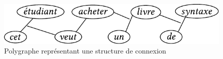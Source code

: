 {\begin{figure}[H]
\includegraphics[scale=.75]{figures/ceetudiantveutacheterunlivredesyntaxe.pdf}
\caption{\label{fig:}Polygraphe représentant une structure de connexion}
\end{figure}
}


